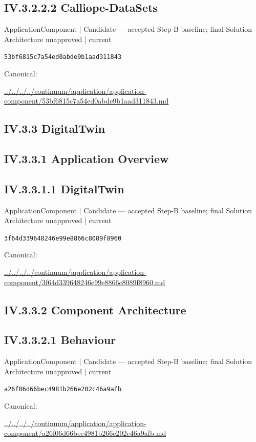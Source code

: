 \documentclass[10pt,a4paper]{article}
\begin{document}
\subsection*{IV.3.2.2.2 Calliope-DataSets}
\label{element-53bf6815c7a54ed0abde9b1aad311843}
{\small ApplicationComponent | Candidate — accepted Step-B baseline; final Solution Architecture unapproved | current}\par
\texttt{53bf6815c7a54ed0abde9b1aad311843}\par
Canonical: \par
{\footnotesize\url{../../../../continuum/application/application-component/53bf6815c7a54ed0abde9b1aad311843.md}}\par
\subsection*{IV.3.3 DigitalTwin}
\subsection*{IV.3.3.1 Application Overview}
\subsection*{IV.3.3.1.1 DigitalTwin}
\label{element-3f64d339648246e99e8866c8089f8960}
{\small ApplicationComponent | Candidate — accepted Step-B baseline; final Solution Architecture unapproved | current}\par
\texttt{3f64d339648246e99e8866c8089f8960}\par
Canonical: \par
{\footnotesize\url{../../../../continuum/application/application-component/3f64d339648246e99e8866c8089f8960.md}}\par
\subsection*{IV.3.3.2 Component Architecture}
\subsection*{IV.3.3.2.1 Behaviour}
\label{element-a26f06d66bec4981b266e202c46a9afb}
{\small ApplicationComponent | Candidate — accepted Step-B baseline; final Solution Architecture unapproved | current}\par
\texttt{a26f06d66bec4981b266e202c46a9afb}\par
Canonical: \par
{\footnotesize\url{../../../../continuum/application/application-component/a26f06d66bec4981b266e202c46a9afb.md}}\par
\end{document}
